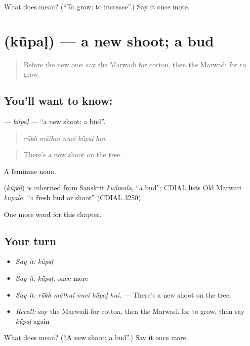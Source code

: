 \begin{tcolorbox}[breakable,colback=teal!4,colframe=teal!35!black,title={Before you move on}]
What does  mean? (\textquotedblleft{}To grow; to increase\textquotedblright{}.) Say it once more.
\end{tcolorbox}
\section[\texorpdfstring{\mw{कूंपळ} (kū̃paḷ)}{कूंपळ (kū̃paḷ)}]{ (kū̃paḷ) — a new shoot; a bud}

\label{lesson:MW-C239-kupal}



\begin{quote}
Before the new one: say the Marwadi for cotton, then the Marwadi for to grow.
\end{quote}

\subsection*{You'll want to know: }
\textbf{} — \emph{kū̃paḷ} — \textquotedblleft{}a new shoot; a bud\textquotedblright{}.

\begin{quote}
    
\end{quote}

\begin{quote}
\emph{rū̃kh māthai nuvī kū̃paḷ hai.}
\end{quote}

\begin{quote}
There's a new shoot on the tree.
\end{quote}

A feminine noun.

\begin{cousinweb}
\textbf{} (\emph{kū̃paḷ}) is inherited from Sanskrit \emph{kuḍmala}, \textquotedblleft{}a bud\textquotedblright{}; CDIAL lists Old Marwari \emph{kūpaḷa}, \textquotedblleft{}a fresh bud or shoot\textquotedblright{} (CDIAL 3250).
\end{cousinweb}

\begin{grammarlens}[title={What you've built}]
One more word for this chapter.
\end{grammarlens}

\subsection*{Your turn}
\begin{itemize}
\raggedright
  \item \emph{Say it:} \emph{kū̃paḷ}
  \item \emph{Say it:} \emph{kū̃paḷ}, once more
  \item \emph{Say it:} \emph{rū̃kh māthai nuvī kū̃paḷ hai.} — There's a new shoot on the tree.
  \item \emph{Recall:} say the Marwadi for cotton, then the Marwadi for to grow, then say \emph{kū̃paḷ} again
\end{itemize}

\begin{tcolorbox}[breakable,colback=teal!4,colframe=teal!35!black,title={Before you move on}]
What does  mean? (\textquotedblleft{}A new shoot; a bud\textquotedblright{}.) Say it once more.
\end{tcolorbox}

